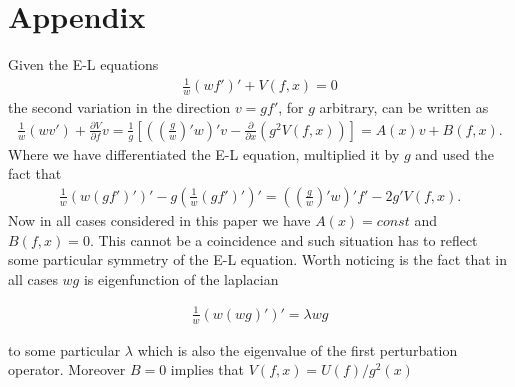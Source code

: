 \section*{Appendix}

Given the E-L equations
\begin{align}
  \frac{1}{w}\left(wf'\right)'+V(f,x)=0
\end{align}
the second variation in the direction $v=gf'$, for $g$ arbitrary, can
be written as
\begin{align}\label{eq:strange_variation}
  \frac{1}{w}\left(wv'\right)+\frac{\partial V}{\partial
    f}v=\frac{1}{g}\left[\left(\left(\frac{g}{w}\right)'w
  \right)'v-\frac{\partial}{\partial x}\left(g^2 V(f,x)\right)\right]=A(x)v+B(f,x).
\end{align}
Where we have differentiated the E-L equation, multiplied it by $g$
and used the fact that
\begin{align}
  \frac{1}{w}\left(w(gf')'\right)'-g\left(\frac{1}{w}(gf')'\right)'
  =\left(\left(\frac{g}{w}\right)'w \right)'f'-2g'V(f,x).
\end{align}
Now in all cases considered in this paper we have $A(x)=const$ and
$B(f,x)=0$. This cannot be a coincidence and such situation has to
reflect some particular symmetry of the E-L equation. Worth noticing
is the fact that in all cases $wg$ is eigenfunction of the laplacian

\begin{align}
  \frac{1}{w}\left(w(wg)'\right)'=\lambda wg
\end{align}

to some particular $\lambda$ which is also the eigenvalue of the first
perturbation operator. Moreover $B=0$ implies that
$V(f,x)=U(f)/g^2(x)$



